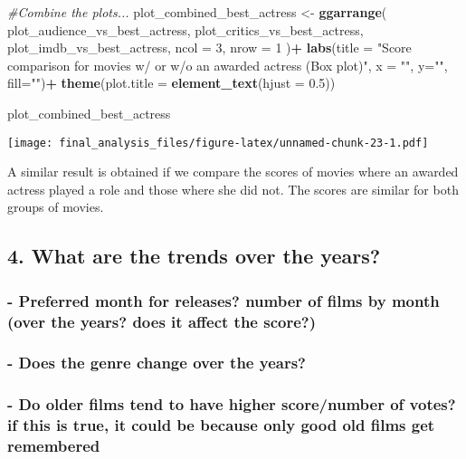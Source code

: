 \documentclass[]{article}
\newenvironment{Shaded}{\begin{snugshade}}{\end{snugshade}}
\newcommand{\KeywordTok}[1]{\textcolor[rgb]{0.13,0.29,0.53}{\textbf{#1}}}
\newcommand{\DataTypeTok}[1]{\textcolor[rgb]{0.13,0.29,0.53}{#1}}
\newcommand{\DecValTok}[1]{\textcolor[rgb]{0.00,0.00,0.81}{#1}}
\newcommand{\FloatTok}[1]{\textcolor[rgb]{0.00,0.00,0.81}{#1}}
\newcommand{\StringTok}[1]{\textcolor[rgb]{0.31,0.60,0.02}{#1}}
\newcommand{\CommentTok}[1]{\textcolor[rgb]{0.56,0.35,0.01}{\textit{#1}}}
\newcommand{\OperatorTok}[1]{\textcolor[rgb]{0.81,0.36,0.00}{\textbf{#1}}}
\newcommand{\NormalTok}[1]{#1}
\begin{document}
\begin{Shaded}
\begin{Highlighting}[]
\CommentTok{#Combine the plots...}
\NormalTok{plot_combined_best_actress <-}
\StringTok{  }\KeywordTok{ggarrange}\NormalTok{(}
\NormalTok{    plot_audience_vs_best_actress,}
\NormalTok{    plot_critics_vs_best_actress,}
\NormalTok{    plot_imdb_vs_best_actress,}
    \DataTypeTok{ncol =} \DecValTok{3}\NormalTok{,}
    \DataTypeTok{nrow =} \DecValTok{1}
\NormalTok{  )}\OperatorTok{+}
\StringTok{  }\KeywordTok{labs}\NormalTok{(}\DataTypeTok{title =} \StringTok{"Score comparison for movies w/ or w/o an awarded actress (Box plot)"}\NormalTok{, }\DataTypeTok{x =} \StringTok{""}\NormalTok{, }\DataTypeTok{y=}\StringTok{""}\NormalTok{, }\DataTypeTok{fill=}\StringTok{""}\NormalTok{)}\OperatorTok{+}
\StringTok{  }\KeywordTok{theme}\NormalTok{(}\DataTypeTok{plot.title =} \KeywordTok{element_text}\NormalTok{(}\DataTypeTok{hjust =} \FloatTok{0.5}\NormalTok{))}

\NormalTok{plot_combined_best_actress}
\end{Highlighting}
\end{Shaded}

\texttt{[image: final\_analysis\_files/figure-latex/unnamed-chunk-23-1.pdf]}

A similar result is obtained if we compare the scores of movies where an
awarded actress played a role and those where she did not. The scores
are similar for both groups of movies.

\subsection{4. What are the trends over the
years?}\label{what-are-the-trends-over-the-years-1}

\subsubsection{- Preferred month for releases? number of films by month
(over the years? does it affect the
score?)}\label{preferred-month-for-releases-number-of-films-by-month-over-the-years-does-it-affect-the-score}

\subsubsection{- Does the genre change over the
years?}\label{does-the-genre-change-over-the-years}

\subsubsection{- Do older films tend to have higher score/number of
votes? if this is true, it could be because only good old films get
remembered}\label{do-older-films-tend-to-have-higher-scorenumber-of-votes-if-this-is-true-it-could-be-because-only-good-old-films-get-remembered}
\end{document}
